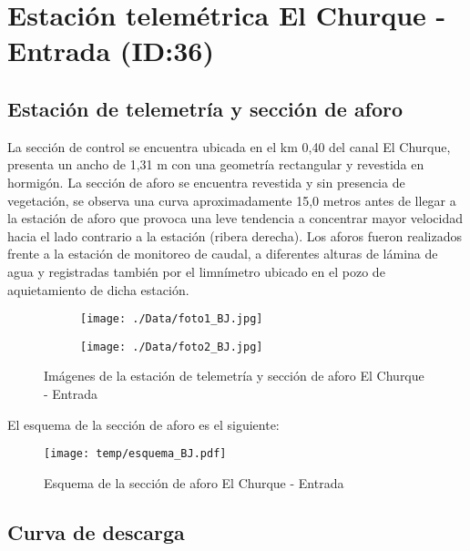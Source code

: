 \documentclass[]{article}
\begin{document}
\clearpage
\section{Estación telemétrica El Churque - Entrada (ID:36)}

\subsection{Estación de telemetría y sección de aforo}

La sección de control se encuentra ubicada en el km 0,40 del canal El Churque, presenta un ancho de 1,31 m con una geometría rectangular y revestida en hormigón. La sección de aforo se encuentra revestida y sin presencia de vegetación, se observa una curva aproximadamente 15,0 metros antes de llegar a la estación de aforo que provoca una leve tendencia a concentrar mayor velocidad hacia el lado contrario a la estación (ribera derecha). Los aforos fueron realizados frente a la estación de monitoreo de caudal, a diferentes alturas de lámina de agua y registradas también por el limnímetro ubicado en el pozo de aquietamiento de dicha estación.

\begin{figure}[H]
  \centering
\begin{subfigure}{.49\textwidth}
  \texttt{[image: ./Data/foto1\_BJ.jpg]}
\end{subfigure}
\hfill
\begin{subfigure}{.49\textwidth}
  \texttt{[image: ./Data/foto2\_BJ.jpg]}
\end{subfigure}
\caption{Imágenes de la estación de telemetría y sección de aforo El Churque - Entrada}
\label{fig:fotos_36}
\end{figure}

El esquema de la sección de aforo es el siguiente:

\begin{figure}[H]
  \centering
  \texttt{[image: temp/esquema\_BJ.pdf]}
\caption{Esquema de la sección de aforo El Churque - Entrada}
\label{fig:Esquema_BJ}
\end{figure}

\subsection{Curva de descarga}\label{curva-de-descarga-35}
\end{document}
